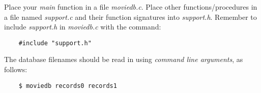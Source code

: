\documentclass{article}
\begin{document}

Place your {\it main} function in a file {\it moviedb.c}. Place other functions/procedures in a file named {\it support.c} and their function signatures into {\it support.h}. Remember to include {\it support.h} in {\it moviedb.c} with the command:

\begin{verbatim}
    #include "support.h"
\end{verbatim}

The database filenames should be read in using {\it command line arguments}, as follows:

\begin{verbatim}
    $ moviedb records0 records1
\end{verbatim}
\end{document}
